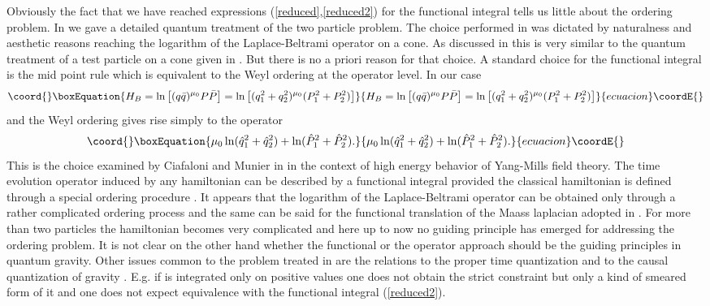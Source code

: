\documentclass[a4paper,12pt]{article}
\begin{document}
Obviously the fact that we have reached expressions
(\ref{reduced},\ref{reduced2}) for the 
functional integral tells us little about the ordering
problem. In \cite{CMS1} we gave a detailed quantum treatment of the
two particle problem.  
The choice performed in \cite{CMS1} was dictated by naturalness and
aesthetic reasons reaching the logarithm of the Laplace-Beltrami
operator on a cone. As discussed in \cite{CMS1} this is very similar
to the quantum treatment of a test particle on a cone given in
\cite{deserjackiwcmp}. But there is no a priori reason for that choice. A
standard choice for the functional integral is the mid point rule
\cite{lee} which is equivalent to the Weyl ordering at the operator
level. In our case
\begin{equation}\coord{}\boxEquation{
H_B=\ln \left[(q\bar q)^{\mu_0} P\bar P\right] = \ln
\left[(q_1^2+q_2^2)^{\mu_0}(P_1^2+P_2^2)\right]  
}{
H_B=\ln \left[(q\bar q)^{\mu_0} P\bar P\right] = \ln
\left[(q_1^2+q_2^2)^{\mu_0}(P_1^2+P_2^2)\right]  
}{ecuacion}\coordE{}\end{equation}
and the Weyl ordering gives rise simply to the operator 
\begin{equation}\coord{}\boxEquation{
\mu_0\ln(\hat{q}_1^2+\hat{q}_2^2)+\ln(\hat{P}_1^2+\hat{P}_2^2).
}{
\mu_0\ln(\hat{q}_1^2+\hat{q}_2^2)+\ln(\hat{P}_1^2+\hat{P}_2^2).
}{ecuacion}\coordE{}\end{equation}
This is the choice examined by Ciafaloni and Munier in
\cite{ciafaloni} in the context of high energy behavior of Yang-Mills
field theory. The time evolution operator induced by any hamiltonian
can be described by a functional integral provided the classical
hamiltonian is defined through a special ordering procedure
\cite{weinberg}. It appears that the logarithm of the Laplace-Beltrami
operator can be obtained only through a rather complicated ordering
process and the same can be said for the functional translation of the
Maass laplacian adopted in \cite{hosoya,carlip2}. For more than two
particles the hamiltonian becomes very complicated and here up to now
no guiding principle has emerged for addressing the ordering
problem. It is not clear on the other hand whether the functional or
the operator approach should be the guiding principles in quantum
gravity. Other issues common to the problem treated in \cite{carlip}
are the relations to the proper time quantization
\cite{dasgupta,ambjorn} and to the causal quantization of gravity
\cite{teitelboim}. E.g. if \coordHE{} is integrated only on positive values
one does not obtain the strict constraint \coordHE{} but
only a kind of smeared form of it and one does not expect equivalence
with the functional integral (\ref{reduced2}).
\end{document}
